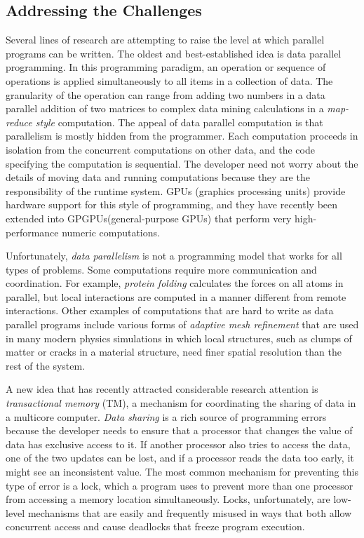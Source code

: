 \documentclass[twocolumn]{article}
\begin{document}
\subsection{Addressing the Challenges}
Several lines of research are attempting to raise the level at which parallel programs
can be written. The oldest and best-established idea is data parallel programming.
In this programming paradigm, an operation or sequence of operations is applied
simultaneously to all items in a collection of data. The granularity of the operation
can range from adding two numbers in a data parallel addition of two matrices
to complex data mining calculations in a \emph{map-reduce style} computation. The
appeal of data parallel computation is that parallelism is mostly hidden from the
programmer. Each computation proceeds in isolation from the concurrent computations
on other data, and the code specifying the computation is sequential. The
developer need not worry about the details of moving data and running computations
because they are the responsibility of the runtime system. GPUs (graphics
processing units) provide hardware support for this style of programming, and they
have recently been extended into GPGPUs(general-purpose GPUs) that perform
very high-performance numeric computations.

Unfortunately, \emph{data parallelism} is not a programming model that works for all
types of problems. Some computations require more communication and coordination.
For example, \emph{protein folding} calculates the forces on all atoms in parallel, but
local interactions are computed in a manner different from remote interactions.
Other examples of computations that are hard to write as data parallel programs
include various forms of \emph{adaptive mesh refinement} that are used in many modern
physics simulations in which local structures, such as clumps of matter or cracks in
a material structure, need finer spatial resolution than the rest of the system.

A new idea that has recently attracted considerable research attention is \emph{transactional
memory} (TM), a mechanism for coordinating the sharing of data in a
multicore computer. \emph{Data sharing} is a rich source of programming errors because
the developer needs to ensure that a processor that changes the value of data has
exclusive access to it. If another processor also tries to access the data, one of the
two updates can be lost, and if a processor reads the data too early, it might see an
inconsistent value. The most common mechanism for preventing this type of error
is a lock, which a program uses to prevent more than one processor from accessing
a memory location simultaneously. Locks, unfortunately, are low-level mechanisms
that are easily and frequently misused in ways that both allow concurrent access
and cause deadlocks that freeze program execution.
\end{document}
